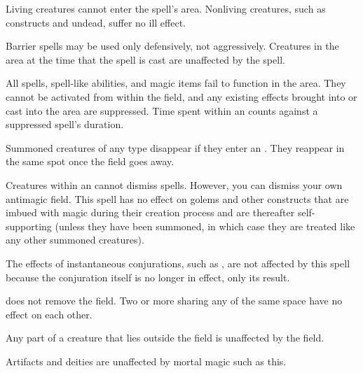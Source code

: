 \begin{spellheader}
\end{spellheader}
\spelldur{\durlong \dismissable}
\spellline
\spelleffect Living creatures cannot enter the spell's area. Nonliving creatures, such as constructs and undead, suffer no ill effect.
\begin{spellfooter}
    \spellnotes Barrier spells may be used only defensively, not aggressively. Creatures in the area at the time that the spell is cast are unaffected by the spell.
\end{spellfooter}

\begin{spellheader}
    \spelldur{\durlong \dismissable}
\end{spellheader}
\spelleffect All spells, spell-like abilities, and magic items fail to function in the area. They cannot be activated from within the field, and any existing effects brought into or cast into the area are suppressed. Time spent within an  counts against a suppressed spell's duration.
\par Summoned creatures of any type disappear if they enter an . They reappear in the same spot once the field goes away. 
\par Creatures within an  cannot dismiss spells. However, you can dismiss your own antimagic field.
\spellnotes This spell has no effect on golems and other constructs that are imbued with magic during their creation process and are thereafter self-supporting (unless they have been summoned, in which case they are treated like any other summoned creatures).

The effects of instantaneous conjurations, such as , are not affected by this spell because the conjuration itself is no longer in effect, only its result.

\par {} does not remove the field. Two or more  sharing any of the same space have no effect on each other.
\par Any part of a creature that lies outside the field is unaffected by the field.
\par Artifacts and deities are unaffected by mortal magic such as this. 

